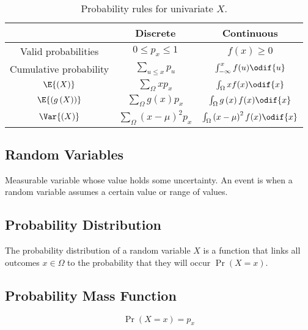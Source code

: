 \documentclass{article}
\begin{document}
\begin{minipage}{126.1962963mm}
    \begin{table}[H]
        \centering
        \begin{tabular}{c c c }
            \toprule
                                                     & \textbf{Discrete}                              & \textbf{Continuous}                                    \\
            \midrule
            Valid probabilities                      & \(0 \leq p_x \leq 1\)                          & \(f(x) \geq 0\)                                        \\
            Cumulative probability                   & \(\sum_{u \leq x} p_u\)                        & \(\int_{-\infty}^{x} f(u) \odif{u}\)                   \\
            \(\E{\left( X \right)}\)                 & \(\sum_{\Omega} xp_x\)                         & \(\int_{\Omega} xf(x)\odif{x}\)                        \\
            \(\E{\left( g\left( X \right) \right)}\) & \(\sum_{\Omega} g\left( x \right)p_x\)         & \(\int_{\Omega} g\left( x \right)f(x)\odif{x}\)        \\
            \(\Var{\left( X \right)}\)               & \(\sum_{\Omega} \left( x - \mu \right)^2 p_x\) & \(\int_{\Omega} \left( x - \mu \right)^2f(x)\odif{x}\) \\
            \bottomrule
        \end{tabular}
        \caption{Probability rules for univariate \(X\).} %
    \end{table}
    \begin{multicols}{2}
        \section{Random Variables}
        Measurable variable whose value holds some uncertainty.
        An event is when a random variable assumes a certain value or range of values.
        \subsection{Probability Distribution}
        The probability distribution of a random variable \(X\) is a function that links all outcomes \(x \in \Omega\)
        to the probability that they will occur \(\Pr{\left( X = x \right)}\).
        \subsection{Probability Mass Function}
        \begin{equation*}
            \Pr{\left( X = x \right)} = p_x
        \end{equation*}

\end{multicols}
\end{minipage}
\end{document}
